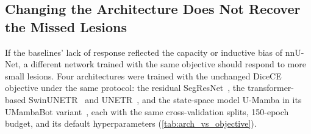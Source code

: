 \subsection{Changing the Architecture Does Not Recover the Missed Lesions}
\label{sec:arch_vs_objective}

If the baselines' lack of response reflected the capacity or inductive bias
of nnU-Net, a different network trained with the same objective should
respond to more small lesions. Four architectures were trained with the
unchanged DiceCE objective under the same protocol: the residual
SegResNet~\cite{crimi_3d_2019}, the transformer-based
SwinUNETR~\cite{hatamizadeh_swin_2022} and
UNETR~\cite{hatamizadeh_unetr_2021}, and the state-space model U-Mamba in
its UMambaBot variant~\cite{ma_u-mamba_2024}, each with the same
cross-validation splits, 150-epoch budget, and its default hyperparameters
(\cref{tab:arch_vs_objective}).

\begin{table}[t]
\centering
\caption{Small-lesion detection by architecture and objective on the
MSLesSeg test set, without post-processing. All architectures are trained
with the DiceCE objective, except nnU-Net with CATMIL. Values are means
over the test scans and the five fold models. Best values are shown in
\textbf{bold}; second-best values are \underline{underlined}.}
\label{tab:arch_vs_objective}
\end{table}

